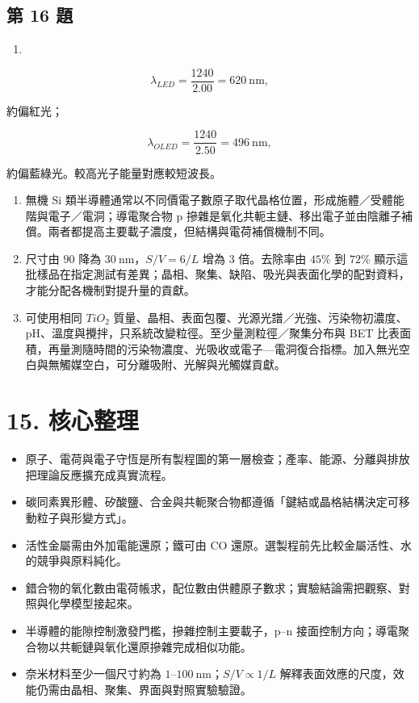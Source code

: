 \documentclass[11pt,a4paper]{article}
\providecommand{\tightlist}{%
  \setlength{\itemsep}{0pt}\setlength{\parskip}{0pt}}
\begin{document}
\subsection{第 16 題}\label{ux7b2c-16-ux984c}

\begin{enumerate}
\def\labelenumi{(\alph{enumi})}
\tightlist
\item
\end{enumerate}

\[
\lambda_{LED}=\frac{1240}{2.00}=620\ \mathrm{nm},
\]

約偏紅光；

\[
\lambda_{OLED}=\frac{1240}{2.50}=496\ \mathrm{nm},
\]

約偏藍綠光。較高光子能量對應較短波長。

\begin{enumerate}
\def\labelenumi{(\alph{enumi})}
\setcounter{enumi}{1}
\item
  無機 Si 類半導體通常以不同價電子數原子取代晶格位置，形成施體／受體能階與電子／電洞；導電聚合物 p 摻雜是氧化共軛主鏈、移出電子並由陰離子補償。兩者都提高主要載子濃度，但結構與電荷補償機制不同。
\item
  尺寸由 \(90\) 降為 \(30\ \mathrm{nm}\)，\(S/V=6/L\) 增為 \(3\) 倍。去除率由 \(45\%\) 到 \(72\%\) 顯示這批樣品在指定測試有差異；晶相、聚集、缺陷、吸光與表面化學的配對資料，才能分配各機制對提升量的貢獻。
\item
  可使用相同 \(TiO_2\) 質量、晶相、表面包覆、光源光譜／光強、污染物初濃度、pH、溫度與攪拌，只系統改變粒徑。至少量測粒徑／聚集分布與 BET 比表面積，再量測隨時間的污染物濃度、光吸收或電子---電洞復合指標。加入無光空白與無觸媒空白，可分離吸附、光解與光觸媒貢獻。
\end{enumerate}

\section{15. 核心整理}\label{ux6838ux5fc3ux6574ux7406}

\begin{itemize}
\tightlist
\item
  原子、電荷與電子守恆是所有製程圖的第一層檢查；產率、能源、分離與排放把理論反應擴充成真實流程。
\item
  碳同素異形體、矽酸鹽、合金與共軛聚合物都遵循「鍵結或晶格結構決定可移動粒子與形變方式」。
\item
  活性金屬需由外加電能還原；鐵可由 CO 還原。選製程前先比較金屬活性、水的競爭與原料純化。
\item
  錯合物的氧化數由電荷帳求，配位數由供體原子數求；實驗結論需把觀察、對照與化學模型接起來。
\item
  半導體的能隙控制激發門檻，摻雜控制主要載子，p--n 接面控制方向；導電聚合物以共軛鏈與氧化還原摻雜完成相似功能。
\item
  奈米材料至少一個尺寸約為 \(1\)--\(100\ \mathrm{nm}\)；\(S/V\propto1/L\) 解釋表面效應的尺度，效能仍需由晶相、聚集、界面與對照實驗驗證。
\end{itemize}
\end{document}
